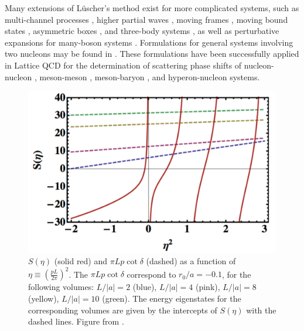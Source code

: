 Many extensions of L\"uscher's method exist for more complicated systems, such as multi-channel processes \cite{Briceno:2012yi,Hansen:2012tf,Li:2014wga,Briceno:2014oea,Briceno:2015tza,Briceno:2015csa,Briceno:2015axa,Briceno:2014uqa}, higher partial waves \cite{Luu:2011ep,Konig:2011nz,Koenig:2011ti}, moving frames \cite{Rummukainen:1995vs,Kim:2005gf}, moving bound states \cite{Bour:2011ef,Davoudi:2011md}, asymmetric boxes \cite{Li:2003jn,Feng:2004ua}, and three-body systems \cite{Hansen:2016fzj,Hansen:2015zga,Hansen:2014eka,Briceno:2012rv}, as well as perturbative expansions for many-boson systems \cite{Beane:2007qr,Detmold:2008gh,Smigielski:2008pa}. Formulations for general systems involving two nucleons may be found in \cite{Briceno:2013lba,Briceno:2013bda}. These formulations have been successfully applied in Lattice QCD for the determination of scattering phase shifts of nucleon-nucleon \cite{Beane:2006mx,Beane:2011iw,Beane:2012vq,Detmold:2015daa,Beane:2015yha,Chang:2015qxa,Orginos:2015aya,Yamazaki:2012hi,Yamazaki:2015asa,Berkowitz:2015eaa,Murano:2013xxa}, meson-meson \cite{Wilson:2014cna,Wilson:2015dqa,Dudek:2012gj,Dudek:2012xn,Dudek:2014qha,Beane:2011sc,Aoki:2007rd,Aoki:2011yj,Pelissier:2012pi,Feng:2010es,Torres:2014vna,Bolton:2015psa,Briceno:2015dca,Lang:2012sv,Prelovsek:2013ela,Lang:2014yfa,Lang:2015hza,Lang:2011mn,Briceno:2016kkp}, meson-baryon \cite{Verduci:2014csa,Lang:2012db,Torok:2009dg,Detmold:2015qwf}, and hyperon-nucleon \cite{Beane:2012ey,Beane:2009py,Beane:2006gf} systems.

\begin{figure}
\caption{\label{fig:luscher}$S(\eta)$ (solid red) and $\pi L p \cot \delta$ (dashed) as a function of $\eta \equiv \left(\frac{p L}{2\pi}\right)^2$. The $\pi L p \cot \delta$ correspond to $r_0/a=-0.1$, for the following volumes: $L/|a|=2$ (blue), $L/|a|=4$ (pink), $L/|a|=8$ (yellow), $L/|a|=10$ (green).  The energy eigenstates for the corresponding volumes are given by the intercepts of $S(\eta)$ with the dashed lines. Figure from \cite{Drut:2012md}.}
\includegraphics[width=0.5\linewidth]{Chapter5-figures/luscher.pdf}
\end{figure}


